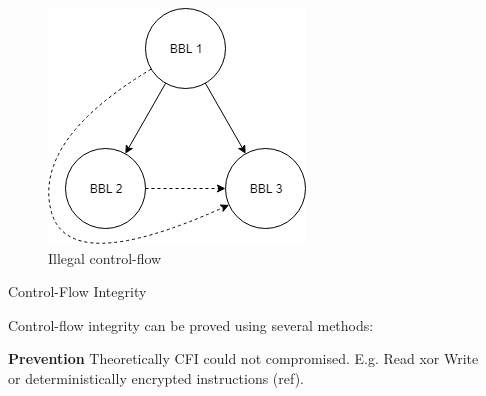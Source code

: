 \documentclass[final]{beamer}
\newlength{\sepwid}
\newlength{\onecolwid}
\newlength{\twocolwid}
\begin{document}
\begin{frame}[t]
\begin{columns}[t]
\begin{column}{\sepwid}\end{column} %

\begin{column}{\twocolwid} %


\begin{columns}[t,totalwidth=\twocolwid] %

\begin{column}{\onecolwid}\vspace{-.6in} %

\begin{figure}
\includegraphics[width=\linewidth]{images/CFGIllegal.png}
\caption{Illegal control-flow}
\vspace{-1cm}
\end{figure}

\begin{block}{Control-Flow Integrity}

Control-flow integrity can be proved using several methods:


\textbf{Prevention} Theoretically CFI could not compromised. E.g. Read xor Write or deterministically encrypted instructions (ref).


\end{block}
\end{column}
\end{columns}
\end{column}
\end{columns}
\end{frame}
\end{document}
